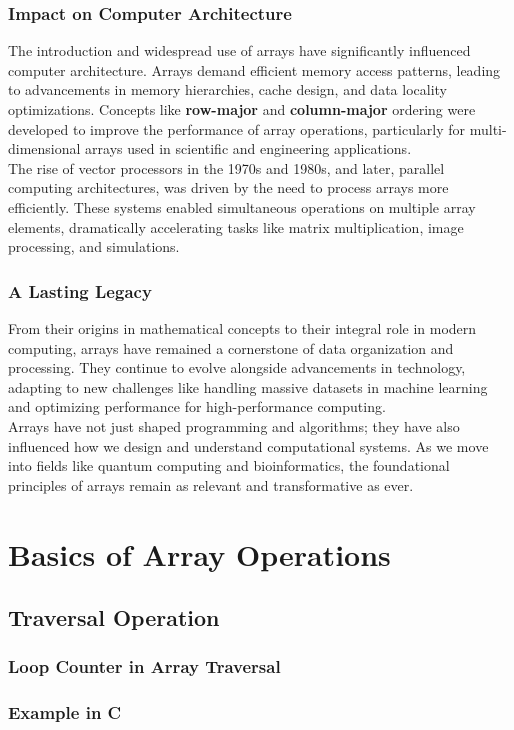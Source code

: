 \documentclass[12pt, oneside]{book}
\begin{document}
\subsection{Impact on Computer Architecture}
The introduction and widespread use of arrays have significantly influenced computer architecture. Arrays demand efficient memory access patterns, leading to advancements in memory hierarchies, cache design, and data locality optimizations. Concepts like \textbf{row-major} and \textbf{column-major} ordering were developed to improve the performance of array operations, particularly for multi-dimensional arrays used in scientific and engineering applications.\\
The rise of vector processors in the 1970s and 1980s, and later, parallel computing architectures, was driven by the need to process arrays more efficiently. These systems enabled simultaneous operations on multiple array elements, dramatically accelerating tasks like matrix multiplication, image processing, and simulations.\\
\subsection{A Lasting Legacy}
From their origins in mathematical concepts to their integral role in modern computing, arrays have remained a cornerstone of data organization and processing. They continue to evolve alongside advancements in technology, adapting to new challenges like handling massive datasets in machine learning and optimizing performance for high-performance computing.\\
Arrays have not just shaped programming and algorithms; they have also influenced how we design and understand computational systems. As we move into fields like quantum computing and bioinformatics, the foundational principles of arrays remain as relevant and transformative as ever.
\chapter{Basics of Array Operations}
\section{Traversal Operation}
\subsection{Loop Counter in Array Traversal} 
\subsection{Example in C}
\end{document}
